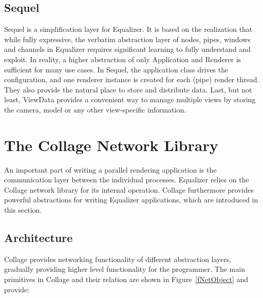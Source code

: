 \documentclass[10pt,journal,compsoc]{IEEEtran}
\newcommand{\fig}[1]{Figure~\ref{#1}}
\begin{document}
\subsection{\textsf{Sequel}}\label{sec:sequel}

\textsf{Sequel} is a simplification layer for \textsf{Equalizer}. It is based on
the realization that while fully expressive, the verbatim abstraction layer of
nodes, pipes, windows and channels in \textsf{Equalizer} requires significant
learning to fully understand and exploit. In reality, a higher abstraction of
only \textsf{Application} and \textsf{Renderer} is sufficient for many use
cases. In \textsf{Sequel}, the application class drives the configuration, and
one renderer instance is created for each (pipe) render thread. They also
provide the natural place to store and distribute data. Last, but not least,
\textsf{ViewData} provides a convenient way to manage multiple views by storing
the camera, model or any other view-specific information.


\section{The \textsf{Collage} Network Library}

An important part of writing a parallel rendering application is the
communication layer between the individual processes. \textsf{Equalizer} relies
on the
\textsf{Collage} network library for its internal operation. \textsf{Collage}
furthermore provides
powerful abstractions for writing \textsf{Equalizer} applications, which are
introduced
in this section.

\subsection{Architecture}

\textsf{Collage} provides networking functionality of different abstraction
layers, gradually providing higher level functionality for the programmer. The
main primitives in \textsf{Collage} and their relation are shown in
\fig{fNetObject} and provide:
\end{document}
